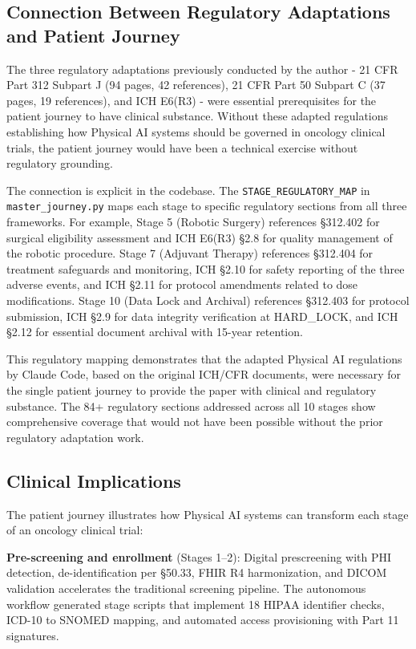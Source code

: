 \subsection{Connection Between Regulatory Adaptations and Patient Journey}

The three regulatory adaptations previously conducted by the author - 21 CFR Part 312 Subpart J (94 pages, 42 references), 21 CFR Part 50 Subpart C (37 pages, 19 references), and ICH E6(R3) - were essential prerequisites for the patient journey to have clinical substance. Without these adapted regulations establishing how Physical AI systems should be governed in oncology clinical trials, the patient journey would have been a technical exercise without regulatory grounding.

The connection is explicit in the codebase. The \texttt{STAGE\_REGULATORY\_MAP} in \texttt{master\_journey.py} maps each stage to specific regulatory sections from all three frameworks. For example, Stage 5 (Robotic Surgery) references \S312.402 for surgical eligibility assessment and ICH E6(R3) \S2.8 for quality management of the robotic procedure. Stage 7 (Adjuvant Therapy) references \S312.404 for treatment safeguards and monitoring, ICH \S2.10 for safety reporting of the three adverse events, and ICH \S2.11 for protocol amendments related to dose modifications. Stage 10 (Data Lock and Archival) references \S312.403 for protocol submission, ICH \S2.9 for data integrity verification at HARD\_LOCK, and ICH \S2.12 for essential document archival with 15-year retention.

This regulatory mapping demonstrates that the adapted Physical AI regulations by Claude Code, based on the original ICH/CFR documents, were necessary for the single patient journey to provide the paper with clinical and regulatory substance. The 84+ regulatory sections addressed across all 10 stages show comprehensive coverage that would not have been possible without the prior regulatory adaptation work.

\subsection{Clinical Implications}

The patient journey illustrates how Physical AI systems can transform each stage of an oncology clinical trial:

\textbf{Pre-screening and enrollment} (Stages 1--2): Digital prescreening with PHI detection, de-identification per \S50.33, FHIR R4 harmonization, and DICOM validation accelerates the traditional screening pipeline. The autonomous workflow generated stage scripts that implement 18 HIPAA identifier checks, ICD-10 to SNOMED mapping, and automated access provisioning with Part 11 signatures.

